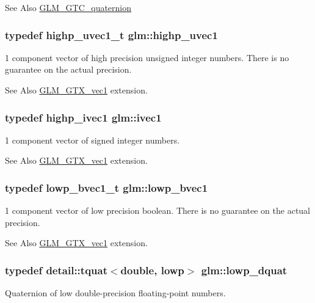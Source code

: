 \begin{DoxySeeAlso}{See Also}
\hyperlink{group__gtc__quaternion}{G\-L\-M\-\_\-\-G\-T\-C\-\_\-quaternion} 
\end{DoxySeeAlso}
\hypertarget{namespaceglm_a2a480125ab05aa522d883651ea1101f8}{
\subsubsection[{highp\-\_\-uvec1}]{\setlength{\rightskip}{0pt plus 5cm}typedef {\bf highp\-\_\-uvec1\-\_\-t} {\bf glm\-::highp\-\_\-uvec1}}}\label{namespaceglm_a2a480125ab05aa522d883651ea1101f8}
1 component vector of high precision unsigned integer numbers. There is no guarantee on the actual precision. \begin{DoxySeeAlso}{See Also}
\hyperlink{group__gtx__vec1}{G\-L\-M\-\_\-\-G\-T\-X\-\_\-vec1} extension. 
\end{DoxySeeAlso}
\hypertarget{namespaceglm_a946031cea0c22745848ebd873e6facb0}{
\subsubsection[{ivec1}]{\setlength{\rightskip}{0pt plus 5cm}typedef {\bf highp\-\_\-ivec1} {\bf glm\-::ivec1}}}\label{namespaceglm_a946031cea0c22745848ebd873e6facb0}
1 component vector of signed integer numbers. \begin{DoxySeeAlso}{See Also}
\hyperlink{group__gtx__vec1}{G\-L\-M\-\_\-\-G\-T\-X\-\_\-vec1} extension. 
\end{DoxySeeAlso}
\hypertarget{namespaceglm_af22d6a46a35bcda63801fe78c033f35f}{
\subsubsection[{lowp\-\_\-bvec1}]{\setlength{\rightskip}{0pt plus 5cm}typedef {\bf lowp\-\_\-bvec1\-\_\-t} {\bf glm\-::lowp\-\_\-bvec1}}}\label{namespaceglm_af22d6a46a35bcda63801fe78c033f35f}
1 component vector of low precision boolean. There is no guarantee on the actual precision. \begin{DoxySeeAlso}{See Also}
\hyperlink{group__gtx__vec1}{G\-L\-M\-\_\-\-G\-T\-X\-\_\-vec1} extension. 
\end{DoxySeeAlso}
\hypertarget{namespaceglm_ad5f207f07b36f4ebd98338c21b92062e}{
\subsubsection[{lowp\-\_\-dquat}]{\setlength{\rightskip}{0pt plus 5cm}typedef {\bf detail\-::tquat}$<$double, lowp$>$ {\bf glm\-::lowp\-\_\-dquat}}}\label{namespaceglm_ad5f207f07b36f4ebd98338c21b92062e}
Quaternion of low double-\/precision floating-\/point numbers.

